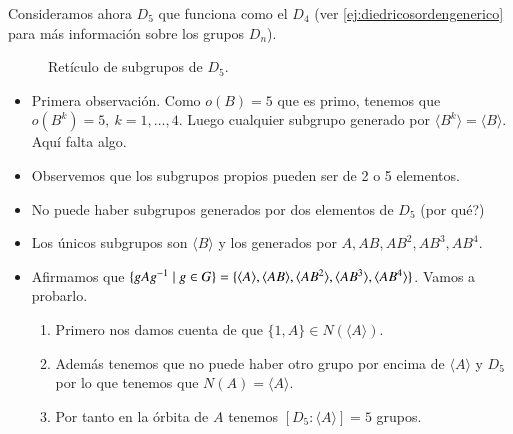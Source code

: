 \begin{ej}
	Consideramos ahora $D_5$ que funciona como el $D_4$ (ver \autoref{ej:diedricosordengenerico} para más información sobre los grupos $D_n$).
	\begin{figure}[h]
		\centering
		\caption{Retículo de subgrupos de $D_5$.}
		\label{ej:reticulod5}
	\end{figure}

	\begin{itemize}
		\item Primera observación. Como $o(B) = 5$ que es primo, tenemos que $o(B^k) = 5,\ k = 1, \dots, 4$. Luego cualquier subgrupo generado por $\langle B^k \rangle = \langle B \rangle$. Aquí falta algo. %
		\item Observemos que los subgrupos propios pueden ser de 2 o 5 elementos.
		\item No puede haber subgrupos generados por dos elementos de $D_5$ (por qué?)
		\item Los únicos subgrupos son $\langle B \rangle$ y los generados por $A, AB, AB^2, AB^3, AB^4$.
		\item Afirmamos que $\{gAg^{-1} \mid g \in G\} = \{\langle A \rangle, \langle AB \rangle, \langle AB^2 \rangle, \langle AB^3 \rangle, \langle AB^4 \rangle \}$. Vamos a probarlo.
		
		\begin{enumerate}
			\item Primero nos damos cuenta de que $\{1, A\} \in N(\langle A \rangle)$.
			\item Además tenemos que no puede haber otro grupo por encima de $\langle A \rangle$ y $D_5$ por lo que tenemos que $N(A) = \langle A \rangle$.
			\item Por tanto en la órbita de $A$ tenemos $[D_5:\langle A \rangle] = 5$ grupos.
		\end{enumerate}
		
	\end{itemize}
\end{ej}
